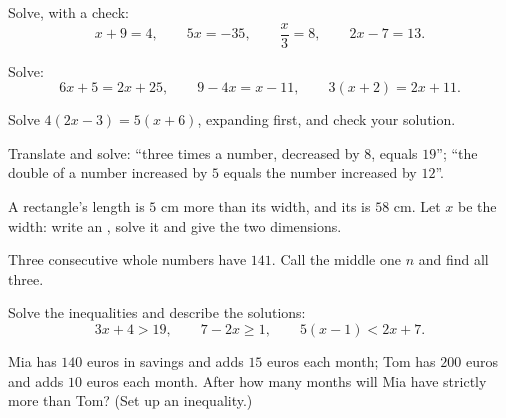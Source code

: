 \begin{exercise}[$\star$]\label{exo:g8:equations:4}
Solve, with a check:
\[
x + 9 = 4, \qquad
5x = -35, \qquad
\frac{x}{3} = 8, \qquad
2x - 7 = 13 .
\]
\end{exercise}

\begin{exercise}[$\star$]\label{exo:g8:equations:5}
Solve:
\[
6x + 5 = 2x + 25, \qquad
9 - 4x = x - 11, \qquad
3(x + 2) = 2x + 11 .
\]
\end{exercise}

\begin{exercise}[$\star$]\label{exo:g8:equations:6}
Solve $4(2x - 3) = 5(x + 6)$, expanding first, and check your
solution.
\end{exercise}

\begin{exercise}[$\star$]\label{exo:g8:equations:7}
Translate and solve: ``three times a number, decreased by $8$, equals
$19$''; ``the double of a number increased by $5$ equals the number
increased by $12$''.
\end{exercise}

\begin{exercise}[$\star\star$]\label{exo:g8:equations:8}
A rectangle's length is $5$ cm more than its width, and its 
is $58$ cm. Let $x$ be the width: write an , solve it and give
the two dimensions.
\end{exercise}

\begin{exercise}[$\star\star$]\label{exo:g8:equations:9}
Three consecutive whole numbers have  $141$. Call the middle one
$n$ and find all three.
\end{exercise}

\begin{exercise}[$\star\star$]\label{exo:g8:equations:10}
Solve the inequalities and describe the solutions:
\[
3x + 4 > 19, \qquad
7 - 2x \geq 1, \qquad
5(x - 1) < 2x + 7 .
\]
\end{exercise}

\begin{exercise}[$\star\star$]\label{exo:g8:equations:11}
Mia has $140$ euros in savings and adds $15$ euros each month; Tom
has $200$ euros and adds $10$ euros each month. After how many months
will Mia have strictly more than Tom? (Set up an inequality.)
\end{exercise}

